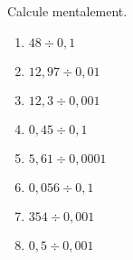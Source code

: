 \begin{exercice}
Calcule mentalement.
\begin{enumerate} 
 \item $48 \div 0,1$ \dotfill \hspace*{11em}
 
 \item $12,97 \div 0,01$ \dotfill \hspace*{11em}

 \item $12,3 \div 0,001$ \dotfill \hspace*{11em}
 
 \item $0,45 \div 0,1$ \dotfill \hspace*{11em}
 	
 \item $5,61 \div 0,0001$ \dotfill \hspace*{11em}
 	
 \item $0,056 \div 0,1$ \dotfill \hspace*{11em}
 
 \item $354 \div 0,001$ \dotfill \hspace*{11em}
 
 \item $0,5 \div 0,001$ \dotfill \hspace*{11em}

 \end{enumerate}
\end{exercice}


